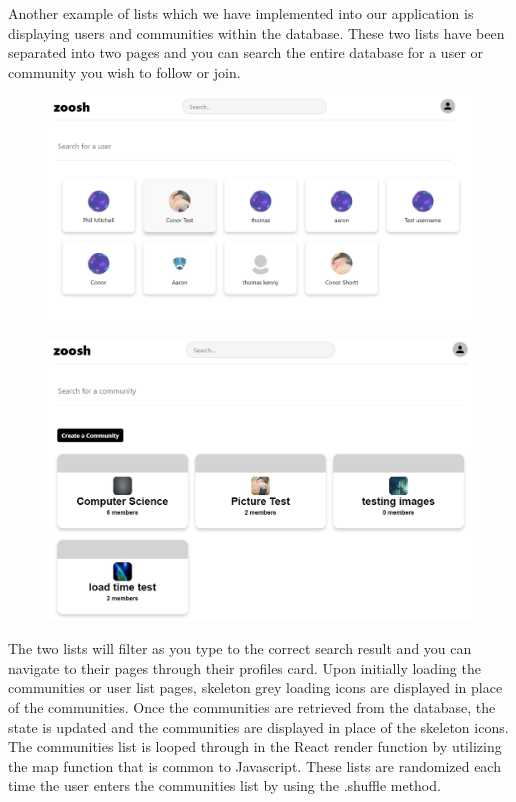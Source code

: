 \newline
Another example of lists which we have implemented into our application is displaying users and communities within the database. These two lists have been separated into two pages and you can search the entire database for a user or community you wish to follow or join.

\begin{figure}[H]
  \centering
  \includegraphics[scale=0.25]{img/users.png}
  \label{fig:Search Users within the website.}
\end{figure}

\begin{figure}[H]
  \centering
  \includegraphics[scale=0.25]{img/communities.PNG}
  \label{fig:Communities within the website.}
\end{figure}

\newline 
The two lists will filter as you type to the correct search result and you can navigate to their pages through their profiles card. Upon initially loading the communities or user list pages, skeleton grey loading icons are displayed in place of the communities. Once the communities are retrieved from the database, the state is updated and the communities are displayed in place of the skeleton icons. The communities list is looped through in the React render function by utilizing the map function that is common to Javascript. These lists are randomized each time the user enters the communities list by using the .shuffle method.

